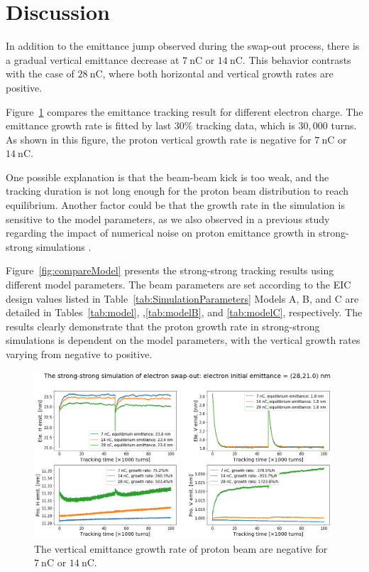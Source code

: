 \documentclass{article}
\begin{document}
\section{Discussion}
In addition to the emittance jump observed during the swap-out 
process, there is a gradual vertical emittance decrease at 
$7 ~\mathrm{nC}$ or $14~\mathrm{nC}$. This behavior 
contrasts with the case of $28~\mathrm{nC}$, where both 
horizontal and vertical growth rates are positive.

Figure~\ref{fig:compareCharge} compares the emittance tracking
result for different electron charge. The emittance growth 
rate is fitted by last $30\%$ tracking data, which is $30,000$
turns. As shown in this figure, the proton vertical growth
rate is negative for $7~\mathrm{nC}$ or $14~\mathrm{nC}$.

One possible explanation is that the beam-beam kick is too 
weak, and the tracking duration is not long enough for the 
proton beam distribution to reach equilibrium. Another factor 
could be that the growth rate in the simulation is sensitive 
to the model parameters, as we also observed in a previous 
study regarding the impact of numerical noise on proton 
emittance growth in strong-strong simulations \cite{xu:beamDynamicsWorkshop}. 

Figure~\ref{fig:compareModel} presents the strong-strong 
tracking results using different model parameters. 
The beam parameters are set according to the EIC design 
values listed in Table~\ref{tab:SimulationParameters}
Models A, B, and C are detailed in Tables~\ref{tab:model},
,\ref{tab:modelB}, and \ref{tab:modelC}, respectively.
The results clearly demonstrate that the proton growth rate 
in strong-strong simulations is dependent on the model 
parameters, with the vertical growth rates varying from 
negative to positive.

\begin{figure}
    \centering
    \includegraphics[width=0.99\textwidth]{pic/compareCharge.png}
    \caption{The vertical emittance growth rate of proton beam are negative for $7~\mathrm{nC}$ or $14~\mathrm{nC}$.}
    \label{fig:compareCharge}
\end{figure}
\end{document}
